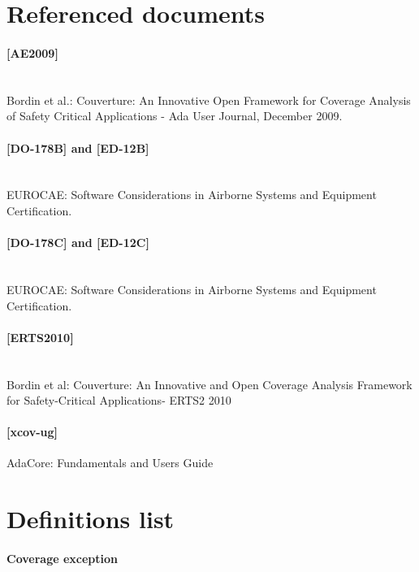 \newcommand{\ug}{[xcov-ug]\space}
\newcommand{\erts}{[ERTS2010]\space}
\newcommand{\adaeurope}{[AE2009]\space}
\newcommand{\castseventeen}{[CAST17]\space}

\section{Referenced documents}
\paragraph*{\adaeurope} \ \\
Bordin et al.: Couverture: An Innovative Open Framework for Coverage Analysis
of Safety Critical Applications - Ada User Journal, December 2009.
\paragraph*{[DO-178B] and [ED-12B]} \ \\
EUROCAE: Software Considerations in Airborne Systems and Equipment
Certification.
\paragraph*{[DO-178C] and [ED-12C]} \ \\
EUROCAE: Software Considerations in Airborne Systems and Equipment
Certification.
\paragraph*{\erts} \ \\
Bordin et al: Couverture: An Innovative and Open Coverage Analysis Framework
for Safety-Critical Applications- ERTS2 2010
\paragraph*{[xcov-ug]}
AdaCore: \xcov{} Fundamentals and Users Guide

\section{Definitions list}

\paragraph*{Coverage exception} \ \\

